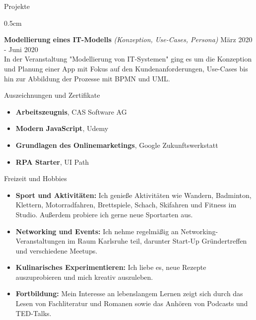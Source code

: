 \documentclass{resume} %
\begin{document}
\begin{rSection}{Projekte}
\begin{adjustwidth}{0.5cm}{}
        \item \textbf{Modellierung eines IT-Modells} \textit{(Konzeption, Use-Cases, Persona)} \hfill {März 2020 - Juni 2020} \\
        {In der Veranstaltung "Modellierung von IT-Systemen" ging es um die Konzeption und Planung einer App mit Fokus auf den Kundenanforderungen, Use-Cases bis hin zur Abbildung der Prozesse mit BPMN und UML.}
    
    \end{adjustwidth}
    
\end{rSection}


\begin{rSection}{Auszeichnungen und Zertifikate}
    \vspace{0.5em}

    \begin{itemize}
        \item \textbf{Arbeitszeugnis}, CAS Software AG
        \item \textbf{Modern JavaScript}, Udemy
        \item \textbf{Grundlagen des Onlinemarketings}, Google Zukunftswerkstatt
        \item \textbf{RPA Starter}, UI Path
    \end{itemize}


\end{rSection}

\begin{rSection}{Freizeit und Hobbies}
    \vspace{0.5em}
    \begin{itemize}
        \item \raggedright{\textbf{Sport und Aktivitäten:} Ich genieße Aktivitäten wie Wandern, Badminton, Klettern, Motorradfahren, Brettspiele, Schach, Skifahren und Fitness im Studio. Außerdem probiere ich gerne neue Sportarten aus.}
        \item \raggedright{\textbf{Networking und Events:} Ich nehme regelmäßig an Networking-Veranstaltungen im Raum Karlsruhe teil, darunter Start-Up Gründertreffen und verschiedene Meetups.}
        \item \raggedright{\textbf{Kulinarisches Experimentieren:} Ich liebe es, neue Rezepte auszuprobieren und mich kreativ auszuleben.} 
        \item \raggedright{\textbf{Fortbildung:} Mein Interesse an lebenslangem Lernen zeigt sich durch das Lesen von Fachliteratur und Romanen sowie das Anhören von Podcasts und TED-Talks.}
    \end{itemize}


\end{rSection}
\end{document}
